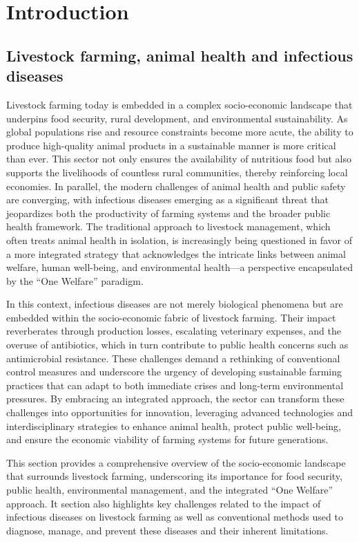 \chapter{Introduction} 

\section{Livestock farming, animal health and infectious diseases}

Livestock farming today is embedded in a complex socio-economic landscape that underpins food security, rural development, and environmental sustainability. As global populations rise and resource constraints become more acute, the ability to produce high-quality animal products in a sustainable manner is more critical than ever. This sector not only ensures the availability of nutritious food but also supports the livelihoods of countless rural communities, thereby reinforcing local economies. In parallel, the modern challenges of animal health and public safety are converging, with infectious diseases emerging as a significant threat that jeopardizes both the productivity of farming systems and the broader public health framework. The traditional approach to livestock management, which often treats animal health in isolation, is increasingly being questioned in favor of a more integrated strategy that acknowledges the intricate links between animal welfare, human well-being, and environmental health—a perspective encapsulated by the “One Welfare” paradigm.

In this context, infectious diseases are not merely biological phenomena but are embedded within the socio-economic fabric of livestock farming. Their impact reverberates through production losses, escalating veterinary expenses, and the overuse of antibiotics, which in turn contribute to public health concerns such as antimicrobial resistance. These challenges demand a rethinking of conventional control measures and underscore the urgency of developing sustainable farming practices that can adapt to both immediate crises and long-term environmental pressures. By embracing an integrated approach, the sector can transform these challenges into opportunities for innovation, leveraging advanced technologies and interdisciplinary strategies to enhance animal health, protect public well-being, and ensure the economic viability of farming systems for future generations.

This section provides a comprehensive overview of the socio-economic landscape that surrounds livestock farming, underscoring its importance for food security, public health, environmental management, and the integrated “One Welfare” approach. It section also highlights key challenges related to the impact of infectious diseases on livestock farming as well as conventional methods used to diagnose, manage, and prevent these diseases and their inherent limitations.

